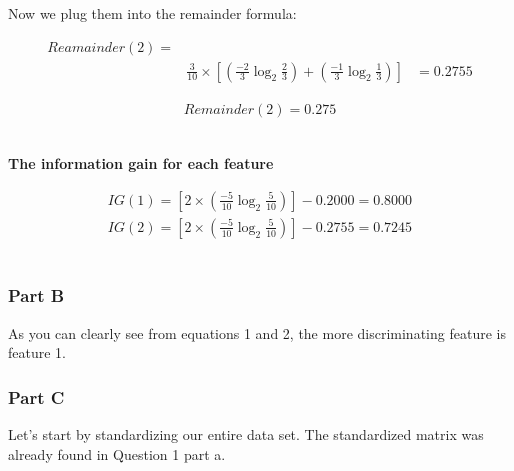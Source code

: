 \documentclass[12pt]{article}
\begin{document}
\noindent

Now we plug them into the remainder formula:

\begin{center}
    
    \begin{align*}
        Reamainder(2) =\\
        &\frac{3}{10} \times [(\frac{-2}{3}\log_{2}{\frac{2}{3}}) + (\frac{-1}{3}\log_{2}{\frac{1}{3}})]
        &= 0.2755
    \end{align*}
    
    \begin{align*}
        Remainder(2) = 0.275
    \end{align*}
    \\[0.1 in]
\end{center}
\textbf{The information gain for each feature}
\begin{center}
    
    \begin{align}
        IG(1) = [2 \times (\frac{-5}{10}\log_{2}{\frac{5}{10}})] - 0.2000 = 0.8000 \\
        IG(2) = [2 \times (\frac{-5}{10}\log_{2}{\frac{5}{10}})] - 0.2755 = 0.7245
    \end{align}
    \\[0.1 in]
\end{center}

\noindent
\subsubsection{Part B}

As you can clearly see from equations 1 and 2, the more discriminating feature is feature 1.

\noindent
\subsubsection{Part C}
Let's start by standardizing our entire data set. The standardized matrix was already found in Question 1 part a.
\end{document}
